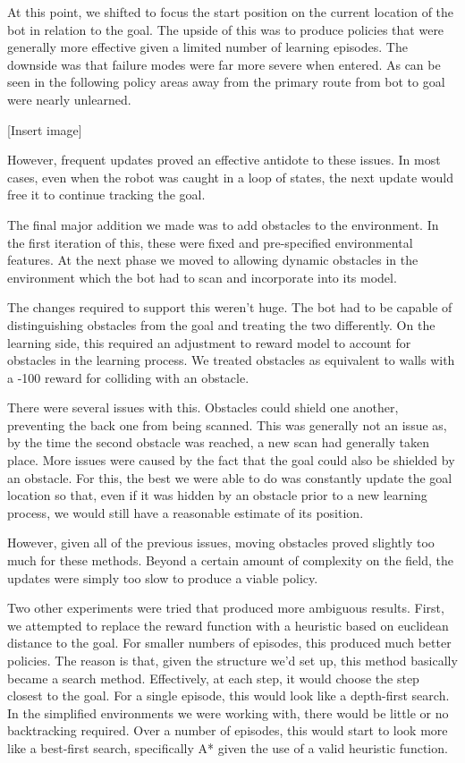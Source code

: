 \documentclass{aiaa-tc}%
\begin{document}
At this point, we shifted to focus the start position
on the current location of the bot in relation to the goal. The upside
of this was to produce policies that were generally more effective
given a limited number of learning episodes. The downside was that
failure modes were far more severe when entered. As can be seen in the
following policy areas away from the primary route from bot to goal
were nearly unlearned.

[Insert image]

However, frequent updates proved an effective antidote to these
issues. In most cases, even when the robot was caught in a loop of
states, the next update would free it to continue tracking the goal.

The final major addition we made was to add obstacles to the
environment. In the first iteration of this, these were fixed and
pre-specified environmental features. At the next phase we moved to
allowing dynamic obstacles in the environment which the bot had to
scan and incorporate into its model.

The changes required to support this weren't huge. The bot had to be
capable of distinguishing obstacles from the goal and treating the two
differently. On the learning side, this required an adjustment to
reward model to account for obstacles in the learning
process. We treated obstacles as equivalent to walls with a -100
reward for colliding with an obstacle.

There were several issues with this. Obstacles could shield one
another, preventing the back one from being scanned. This was
generally not an issue as, by the time the second obstacle was
reached, a new scan had generally taken place. More issues were caused
by the fact that the goal could also be shielded by an
obstacle. For this, the best we were able to do was constantly update
the goal location so that, even if it was hidden by an obstacle prior
to a new learning process, we would still have a reasonable estimate
of its position.

However, given all of the previous issues, moving obstacles proved
slightly too much for these methods. Beyond a certain amount of
complexity on the field, the updates were simply too slow to produce a
viable policy.

Two other experiments were tried that produced more ambiguous
results. First, we attempted to replace the reward function with a
heuristic based on euclidean distance to the goal. For smaller numbers
of episodes, this produced much better policies. The reason is that,
given the structure we'd set up, this method basically became a
search method. Effectively, at each step, it
would choose the step closest to the goal. For a single episode,
this would look like a depth-first search. In the simplified
environments we were working with, there would be little or no
backtracking required. Over a number of episodes, this would start to
look more like a best-first search, specifically A* given the use of a
valid heuristic function.
\end{document}
